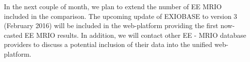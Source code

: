 In the next couple of month, we plan to extend the number of EE MRIO included in the comparison. The upcoming update of EXIOBASE to version 3 (February 2016) will be included in the web-platform providing the first now-casted EE MRIO results. In addition, we will contact other EE - MRIO database providers to discuss a potential inclusion of their data into the unified web-platform.